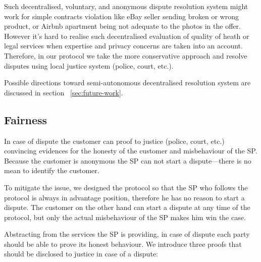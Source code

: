 \documentclass{ieeeaccess}
\begin{document}
Such decentralised, voluntary, and anonymous dispute resolution system
might work for simple contracts violation like eBay seller sending
broken or wrong product, or Airbnb apartment being not adequate to the
photos in the offer. However it's hard to realise such decentralised
evaluation of quality of heath or legal services when expertise and
privacy concerns are taken into an account. Therefore, in our protocol
we take the more conservative approach and resolve disputes using local
justice system (police, court, etc.).

Possible directions toward semi-autonomous decentralised resolution
system are discussed in section ~\ref{sec:future-work}.


\subsection{Fairness}\label{proof-of-justice}

In case of dispute the customer can proof to justice (police, court, etc.) convincing evidences for the honesty of the customer and misbehaviour of the SP. 
Because the customer is anonymous the SP can not start a dispute---there is no mean to identify the customer.

To mitigate the issue, we designed the protocol so that the SP who follows the protocol is always in advantage position, therefore he has no reason to start a dispute. The customer on the other hand can start a dispute at any time of the protocol, but only the actual misbehaviour of the SP makes him win the case.



Abstracting from the services the SP is providing, in case of dispute each party should be able to prove its honest behaviour. We introduce three proofs that should be disclosed to justice in case of a dispute:
\end{document}
